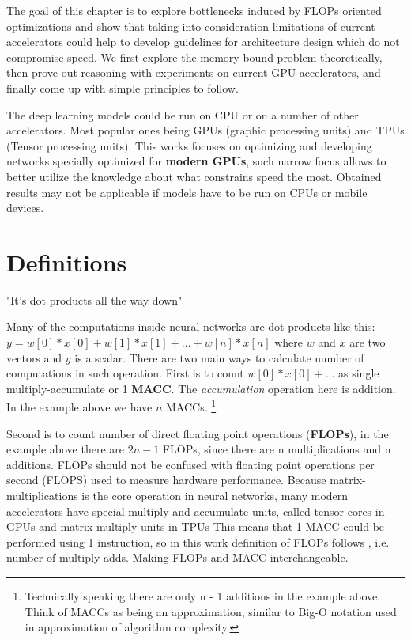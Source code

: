 The goal of this chapter is to explore bottlenecks induced by FLOPs oriented optimizations and show that taking into consideration limitations of current accelerators could help to develop guidelines for architecture design which do not compromise speed. We first explore the memory-bound problem theoretically, then prove out reasoning with experiments on current GPU accelerators, and finally come up with simple principles to follow. 

The deep learning models could be run on CPU or on a number of other accelerators. Most popular ones being GPUs (graphic processing units) and TPUs (Tensor processing units). 
This works focuses on optimizing and developing networks specially optimized for \textbf{modern GPUs}, such narrow focus allows to better utilize the knowledge about what constrains speed the most. Obtained results may not be applicable if models have to be run on CPUs or mobile devices. %




\section{Definitions}

"It’s dot products all the way down" 

Many of the computations inside neural networks are dot products like this: $y = w[0]*x[0] + w[1]*x[1] + \ldots + w[n] * x[n]$ where $w$ and $x$ are two vectors and $y$ is a scalar. There are two main ways to calculate number of computations in such operation. First is to count $ w[0] * x[0] + \ldots $ as single multiply-accumulate or 1 \textbf{MACC}. The \textit{accumulation} operation here is addition. In the example above we have $n$ MACCs. \footnote{Technically speaking there are only n - 1 additions in the example above. Think of MACCs as being an approximation, similar to Big-O notation used in approximation of algorithm complexity.}

Second is to count number of direct floating point operations (\textbf{FLOPs}), in the example above there are $2n - 1$ FLOPs, since there are n multiplications and n additions. FLOPs should not be confused with floating point operations per second (FLOPS) used to measure hardware performance. Because matrix-multiplications is the core operation in neural networks, many modern accelerators have special multiply-and-accumulate units, called tensor cores 
in GPUs and matrix multiply units in TPUs %
This means that 1 MACC could be performed using 1 instruction, so in this work definition of FLOPs follows \cite{zhang2018_shufflenet}, i.e. number of multiply-adds. Making FLOPs and MACC interchangeable.

